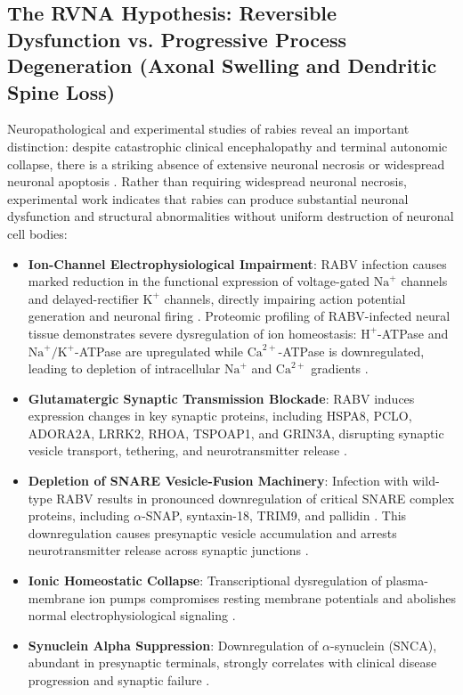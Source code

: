 \documentclass[12pt,a4paper]{article}
\begin{document}
\subsection{The RVNA Hypothesis: Reversible Dysfunction vs. Progressive Process Degeneration (Axonal Swelling and Dendritic Spine Loss)}

Neuropathological and experimental studies of rabies reveal an important distinction: despite catastrophic clinical encephalopathy and terminal autonomic collapse, there is a striking absence of extensive neuronal necrosis or widespread neuronal apoptosis \citep{jackson2011therapy, fu2008rabies}. Rather than requiring widespread neuronal necrosis, experimental work indicates that rabies can produce substantial neuronal dysfunction and structural abnormalities without uniform destruction of neuronal cell bodies:

\begin{itemize}
    \item \textbf{Ion-Channel Electrophysiological Impairment}: RABV infection causes marked reduction in the functional expression of voltage-gated $\mathrm{Na}^+$ channels and delayed-rectifier $\mathrm{K}^+$ channels, directly impairing action potential generation and neuronal firing \citep{iwata1999ion}. Proteomic profiling of RABV-infected neural tissue demonstrates severe dysregulation of ion homeostasis: $\mathrm{H}^+$-ATPase and $\mathrm{Na}^+/\mathrm{K}^+$-ATPase are upregulated while $\mathrm{Ca}^{2+}$-ATPase is downregulated, leading to depletion of intracellular $\mathrm{Na}^+$ and $\mathrm{Ca}^{2+}$ gradients \citep{fu2008rabies}.
    
    \item \textbf{Glutamatergic Synaptic Transmission Blockade}: RABV induces expression changes in key synaptic proteins, including HSPA8, PCLO, ADORA2A, LRRK2, RHOA, TSPOAP1, and GRIN3A, disrupting synaptic vesicle transport, tethering, and neurotransmitter release \citep{chailangkarn2021}.
    
    \item \textbf{Depletion of SNARE Vesicle-Fusion Machinery}: Infection with wild-type RABV results in pronounced downregulation of critical SNARE complex proteins, including $\alpha$-SNAP, syntaxin-18, TRIM9, and pallidin \citep{fu2008rabies, chailangkarn2021}. This downregulation causes presynaptic vesicle accumulation and arrests neurotransmitter release across synaptic junctions \citep{fu2008rabies}.
    
    \item \textbf{Ionic Homeostatic Collapse}: Transcriptional dysregulation of plasma-membrane ion pumps compromises resting membrane potentials and abolishes normal electrophysiological signaling \citep{fu2008rabies}.
    
    \item \textbf{Synuclein Alpha Suppression}: Downregulation of $\alpha$-synuclein (SNCA), abundant in presynaptic terminals, strongly correlates with clinical disease progression and synaptic failure \citep{chailangkarn2021}.
\end{itemize}
\end{document}
